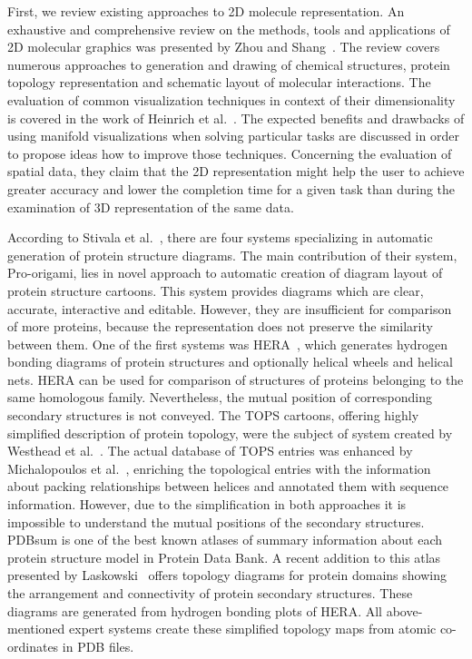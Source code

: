 \documentclass[twocolumn]{bmcart}%
\begin{document}
First, we review existing approaches to 2D molecule representation.
An exhaustive and comprehensive review on the methods, tools and applications of 2D molecular graphics was presented by Zhou and Shang~\cite{Zhou2009}. 
The review covers numerous approaches to generation and drawing of chemical structures, protein topology representation and schematic layout of molecular interactions.
The evaluation of common visualization techniques in context of their dimensionality is covered in the work of Heinrich et al.~\cite{Heinrich2014}.
The expected benefits and drawbacks of using manifold visualizations when solving particular tasks are discussed in order to propose ideas how to improve those techniques.
Concerning the evaluation of spatial data, they claim that the 2D representation might help the user to achieve greater accuracy and lower the completion time for a given task than during the examination of 3D representation of the same data.

According to Stivala et al.~\cite{Stivala2011}, there are four systems specializing in automatic generation of protein structure diagrams.
The main contribution of their system, Pro-origami, lies in novel approach to automatic creation of diagram layout of protein structure cartoons.
This system provides diagrams which are clear, accurate, interactive and editable.
However, they are insufficient for comparison of more proteins, because the representation does not preserve the similarity between them.
One of the first systems was HERA~\cite{Hutchinson1990}, which generates hydrogen bonding diagrams of protein structures and optionally helical wheels and helical nets.
HERA can be used for comparison of structures of proteins belonging to the same homologous family. 
Nevertheless, the mutual position of corresponding secondary structures is not conveyed.
The TOPS cartoons, offering highly simplified description of protein topology, were the subject of system created by Westhead et al.~\cite{Westhead1999}.
The actual database of TOPS entries was enhanced by Michalopoulos et al.~\cite{Michalopoulos2004}, enriching the topological entries with the information about packing relationships between helices and annotated them with sequence information.
However, due to the simplification in both approaches it is impossible to understand the mutual positions of the secondary structures.
PDBsum is one of the best known atlases of summary information about each protein structure model in Protein Data Bank.
A recent addition to this atlas presented by Laskowski~\cite{Laskowski2009} offers topology diagrams for protein domains showing the arrangement and connectivity of protein secondary structures.
These diagrams are generated from hydrogen bonding plots of HERA.
All above-mentioned expert systems create these simplified topology maps from atomic co-ordinates in PDB files.
\end{document}
